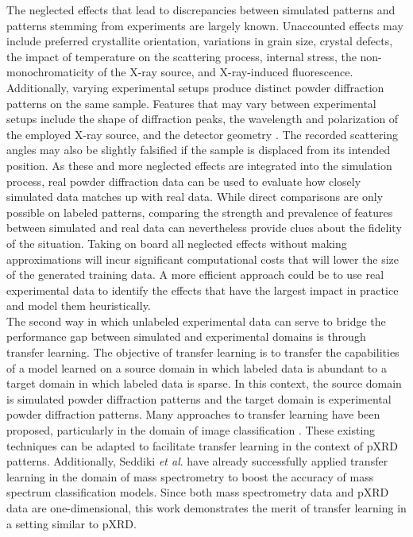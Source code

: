 The neglected effects that lead to discrepancies between simulated patterns and patterns stemming from experiments are largely known. Unaccounted effects may include preferred crystallite orientation, variations in grain size, crystal defects, the impact of temperature on the scattering process, internal stress, the non-monochromaticity of the X-ray source, and X-ray-induced fluorescence\cite{cao2024simxrd, Waseda2011, Pecharsky2023}. Additionally, varying experimental setups produce distinct powder diffraction patterns on the same sample. Features that may vary between experimental setups include the shape of diffraction peaks, the wavelength and polarization of the employed X-ray source, and the detector geometry \cite{cao2024simxrd, Waseda2011, Pecharsky2023}. The recorded scattering angles may also be slightly falsified if the sample is displaced from its intended position\cite{cao2024simxrd,hulbert2023}. As these and more neglected effects are integrated into the simulation process, real powder diffraction data can be used to evaluate how closely simulated data matches up with real data. While direct comparisons are only possible on labeled patterns, comparing the strength and prevalence of features between simulated and real data can nevertheless provide clues about the fidelity of the situation. Taking on board all neglected effects without making approximations will incur significant computational costs that will lower the size of the generated training data. A more efficient approach could be to use real experimental data to identify the effects that have the largest impact in practice and model them heuristically. \\

The second way in which unlabeled experimental data can serve to bridge the performance gap between simulated and experimental domains is through transfer learning. The objective of transfer learning is to transfer the capabilities of a model learned on a source domain in which labeled data is abundant to a target domain in which labeled data is sparse\cite{Zhuang2021}. In this context, the source domain is simulated powder diffraction patterns and the target domain is experimental powder diffraction patterns. Many approaches to transfer learning have been proposed, particularly in the domain of image classification \cite{Gatys2016, Ganin2015}.  These existing techniques can be adapted to facilitate transfer learning in the context of pXRD patterns. Additionally, Seddiki \textit{et al}. have already successfully applied transfer learning in the domain of mass spectrometry to boost the accuracy of mass spectrum classification models\cite{Seddiki2020}. Since both mass spectrometry data and pXRD data are one-dimensional, this work demonstrates the merit of transfer learning in a setting similar to pXRD. \\

